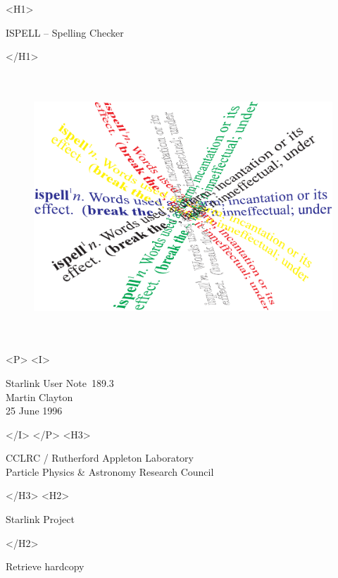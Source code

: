 \documentclass[twoside,11pt]{article}
\newcommand{\stardoccategory}  {Starlink User Note}
\newcommand{\stardocsource}    {sun\stardocnumber}
\newcommand{\stardocnumber}    {189.3}
\newcommand{\stardocauthors}   {Martin Clayton}
\newcommand{\stardocdate}      {25 June 1996}
\newcommand{\stardoctitle}     {ISPELL \sunspec{--}{-} Spelling Checker}
\newcommand{\htmladdnormallink}[2]{#1}
\newcommand{\htmladdimg}[1]{}
\newcommand{\xlabel}[1]{}
\newcommand{\sunspec}[2]{#1}
\newcommand{\sunspec}[2]{#2}
\begin{document}
\begin{htmlonly}
   \xlabel{}
   \begin{rawhtml} <H1> \end{rawhtml}
      \stardoctitle
   \begin{rawhtml} </H1> \end{rawhtml}

   \begin{figure}[h]
   \includegraphics[height=100mm]{sun189_cover}
   \end{figure}

   \begin{rawhtml} <P> <I> \end{rawhtml}
   \stardoccategory\ \stardocnumber \\
   \stardocauthors \\
   \stardocdate
   \begin{rawhtml} </I> </P> <H3> \end{rawhtml}
      \htmladdnormallink{CCLRC}{http://www.cclrc.ac.uk} /
      \htmladdnormallink{Rutherford Appleton Laboratory}
                        {http://www.cclrc.ac.uk/ral} \\
      \htmladdnormallink{Particle Physics \& Astronomy Research Council}
                        {http://www.pparc.ac.uk} \\
   \begin{rawhtml} </H3> <H2> \end{rawhtml}
      \htmladdnormallink{Starlink Project}{http://www.starlink.ac.uk/}
   \begin{rawhtml} </H2> \end{rawhtml}
   \htmladdnormallink{\htmladdimg{source.gif} Retrieve hardcopy}
      {http://www.starlink.ac.uk/cgi-bin/hcserver?\stardocsource}\\


\end{htmlonly}
\end{document}
